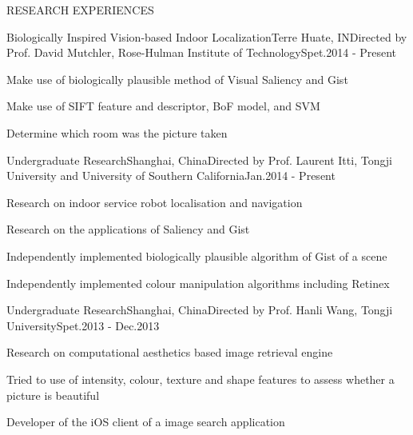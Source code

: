 \documentclass{resume} %
\begin{document}
\begin{rSection}{RESEARCH EXPERIENCES}

  \begin{rSubsection}{Biologically Inspired Vision-based Indoor Localization}{Terre Huate, IN}{Directed by Prof. David
    Mutchler, Rose-Hulman Institute of Technology}{Spet.2014 - Present}
  \item Make use of biologically plausible method of Visual Saliency and Gist
  \item Make use of SIFT feature and descriptor, BoF model, and SVM
  \item Determine which room was the picture taken
  \end{rSubsection}


  \begin{rSubsection}{Undergraduate Research}{Shanghai, China}{Directed by Prof. Laurent Itti, Tongji
    University and University of Southern California}{Jan.2014 - Present}
  \item Research on indoor service robot localisation and navigation
  \item Research on the applications of Saliency and Gist
  \item Independently implemented biologically plausible algorithm of Gist of a scene
  \item Independently implemented colour manipulation algorithms including Retinex
  \end{rSubsection}


  \begin{rSubsection}{Undergraduate Research}{Shanghai, China}{Directed by Prof. Hanli Wang, Tongji
    University}{Spet.2013 - Dec.2013}
  \item Research on computational aesthetics based image retrieval engine
  \item Tried to use of intensity, colour, texture and shape features to assess whether a picture is beautiful
  \item Developer of the iOS client of a image search application
  \end{rSubsection}

\end{rSection}

\end{document}
